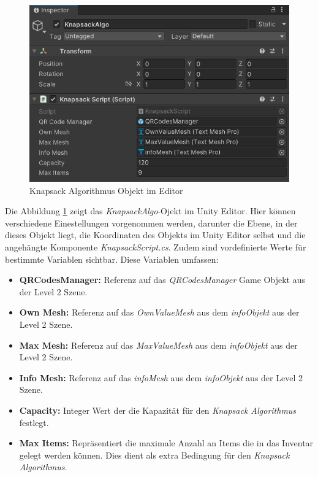 \begin{figure}[h]
    \centering
    \includegraphics[scale=0.8]{images/knapsackEditor}
    \caption{Knapsack Algorithmus Objekt im Editor}
    \label{fig:Knapsack_Editor}
\end{figure}

Die Abbildung \ref{fig:Knapsack_Editor} zeigt das \textit{KnapsackAlgo}-Ojekt im Unity Editor. Hier können verschiedene
Einestellungen vorgenommen werden, darunter die Ebene, in der dieses Objekt liegt, die Koordinaten des Objekts im
Unity Editor selbst und die angehängte Komponente \textit{KnapsackScript.cs}. Zudem sind vordefinierte Werte für
bestimmte Variablen sichtbar. Diese Variablen umfassen:

\begin{itemize}
    \item \textbf{QRCodesManager:} Referenz auf das \textit{QRCodesManager} Game Objekt aus der Level 2 Szene.
    \item \textbf{Own Mesh:} Referenz auf das \textit{OwnValueMesh} aus dem \textit{infoObjekt} aus der Level 2 Szene.
    \item \textbf{Max Mesh:} Referenz auf das \textit{MaxValueMesh} aus dem \textit{infoObjekt} aus der Level 2 Szene.
    \item \textbf{Info Mesh:} Referenz auf das \textit{infoMesh} aus dem \textit{infoObjekt} aus der Level 2 Szene.
    \item \textbf{Capacity:} Integer Wert der die Kapazität für den \textit{Knapsack Algorithmus} festlegt.
    \item \textbf{Max Items:} Repräsentiert die maximale Anzahl an Items die in das Inventar gelegt werden können. Dies
    dient als extra Bedingung für den \textit{Knapsack Algorithmus}.\\
\end{itemize}

